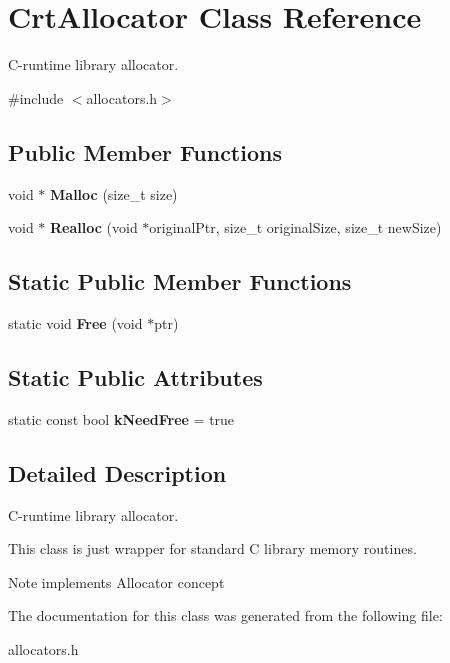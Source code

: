 \hypertarget{a00068}{}\section{Crt\+Allocator Class Reference}
\label{a00068}


C-\/runtime library allocator.  




{\ttfamily \#include $<$allocators.\+h$>$}

\subsection*{Public Member Functions}
\begin{DoxyCompactItemize}
\item 
void $\ast$ {\bfseries Malloc} (size\+\_\+t size)\hypertarget{a00068_acd720631f8c094041afa6c7951f0d935}{}\label{a00068_acd720631f8c094041afa6c7951f0d935}

\item 
void $\ast$ {\bfseries Realloc} (void $\ast$original\+Ptr, size\+\_\+t original\+Size, size\+\_\+t new\+Size)\hypertarget{a00068_a646bb6f68afe773a62a22f7f14f83e97}{}\label{a00068_a646bb6f68afe773a62a22f7f14f83e97}

\end{DoxyCompactItemize}
\subsection*{Static Public Member Functions}
\begin{DoxyCompactItemize}
\item 
static void {\bfseries Free} (void $\ast$ptr)\hypertarget{a00068_a5043907058d906dcb1291e9491560373}{}\label{a00068_a5043907058d906dcb1291e9491560373}

\end{DoxyCompactItemize}
\subsection*{Static Public Attributes}
\begin{DoxyCompactItemize}
\item 
static const bool {\bfseries k\+Need\+Free} = true\hypertarget{a00068_ac7df8398c529290f0cd5950d9492f524}{}\label{a00068_ac7df8398c529290f0cd5950d9492f524}

\end{DoxyCompactItemize}


\subsection{Detailed Description}
C-\/runtime library allocator. 

This class is just wrapper for standard C library memory routines. \begin{DoxyNote}{Note}
implements Allocator concept 
\end{DoxyNote}


The documentation for this class was generated from the following file\+:\begin{DoxyCompactItemize}
\item 
allocators.\+h\end{DoxyCompactItemize}
